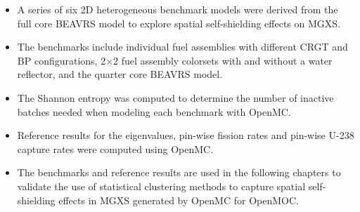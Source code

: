 
\clearpage

\vfill
\begin{highlightsbox}[frametitle=Highlights]
\begin{itemize}
  \item A series of six 2D heterogeneous benchmark models were derived from the full core \ac{BEAVRS} model to explore spatial self-shielding effects on \ac{MGXS}.
  \item The benchmarks include individual fuel assemblies with different \ac{CRGT} and \ac{BP} configurations, 2$\times$2 fuel assembly colorsets with and without a water reflector, and the quarter core \ac{BEAVRS} model.
  \item The Shannon entropy was computed to determine the number of inactive batches needed when modeling each benchmark with OpenMC.
  \item Reference results for the eigenvalues, pin-wise fission rates and pin-wise U-238 capture rates were computed using OpenMC.
  \item The benchmarks and reference results are used in the following chapters to validate the use of statistical clustering methods to capture spatial self-shielding effects in \ac{MGXS} generated by OpenMC for OpenMOC.
\end{itemize}
\end{highlightsbox}
\vfill